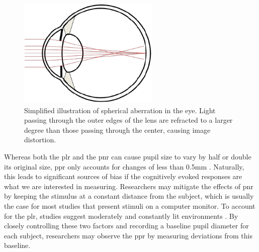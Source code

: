 \begin{figure}[h]
    \centering
    \includegraphics[width=0.6\textwidth]{figures/bt_spherical_aberration.png}
    \caption{Simplified illustration of spherical aberration in the eye. Light passing through the outer edges of the lens are refracted to a larger degree than those passing through the center, causing image distortion. }
    \label{fig:bt_spherical_aberration}
\end{figure}

Whereas both the \acrshort{plr} and the \acrshort{pnr} can cause pupil size to vary by half or double its original size, \acrshort{ppr} only accounts for changes of less than 0.5mm \cite{beatty1982}. Naturally, this leads to significant sources of bias if the cognitively evoked responses are what we are interested in measuring. Researchers may mitigate the effects of \acrshort{pnr} by keeping the stimulus at a constant distance from the subject, which is usually the case for most studies that present stimuli on a computer monitor. To account for the \acrshort{plr}, studies suggest moderately and constantly lit environments \cite{steinauer2004}. By closely controlling these two factors and recording a baseline pupil diameter for each subject, researchers may observe the \acrshort{ppr} by measuring deviations from this baseline. 






